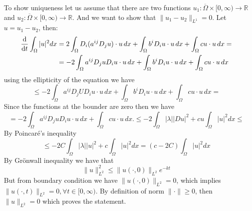 \documentclass{article}
\newcommand{\R}{\mathbb{R}}
\begin{document}
To show uniqueness let us assume that there are two functions $u_1: \overline{\Omega} \times[0, \infty) \to \R$ and $u_2: \overline{\Omega} \times[0, \infty) \to \R$. And we want to show that $\| u_1 - u_2 \|_{L^1} = 0$. Let $u = u_1 - u_2$, then:
\[
   \begin{split}
    \odv{}{t} \int_\Omega |u|^2 dx &= 2 \int_\Omega D_i (a^{ij} D_j u) \cdot u\, dx + \int_\Omega b^i D_i u \cdot u\, dx +  \int_\Omega cu\cdot u\, dx = \\
    &= -2 \int_\Omega a^{ij} D_j u D_i u \cdot u\, dx + \int_\Omega b^i D_i u \cdot u\, dx +  \int_\Omega cu\cdot u\, dx
   \end{split}
\]
using the ellipticity of the equation we have
\[
    \leq -2 \int_\Omega a^{ij} D_j UD_i u \cdot u\, dx + \int_\Omega b^i D_i u \cdot u\, dx +  \int_\Omega cu\cdot u\, dx = 
\]
Since the functions at the bounder are zero then we have 
\[
    = -2 \int_\Omega a^{ij} D_j u D_i u \cdot u\, dx + \int_\Omega cu\cdot u\, dx. \leq -2 \int_\Omega |\lambda| |Du|^2 + cu \int_\Omega |u|^2 dx \leq
\]
By Poincaré's inequality
\[
   \leq  -2 C \int_\Omega |\lambda| |u|^2 + c \int_\Omega |u|^2 dx = (c-2C)\int_\Omega |u|^2 dx 
\]
By Grönwall inequality we have that 
\[
    \|u\|^2_{L^2} \leq \|u (\cdot, 0)\|_{L^2} e^{-k t}
\]
But from boundary condition we have $\|u (\cdot, 0)\|_{L^2} = 0$, which implies $\|u (\cdot, t)\|_{L^2} = 0, \forall t \in [0, \infty)$. By definition of norm $\| \cdot \| \geq 0$, then $\| u \|_{L^2} = 0$ which proves the statement.
\end{document}
